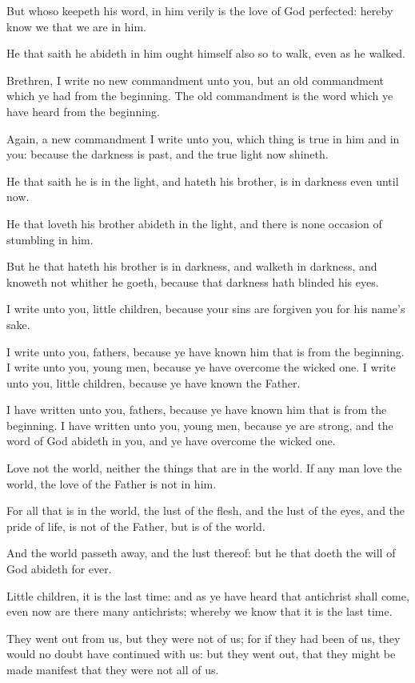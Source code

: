 \verse But whoso keepeth his word, in him verily is the love of God perfected: hereby know we that we are in him.

\verse He that saith he abideth in him ought himself also so to walk, even as he walked.

\verse Brethren, I write no new commandment unto you, but an old commandment which ye had from the beginning. The old commandment is the word which ye have heard from the beginning.

\verse Again, a new commandment I write unto you, which thing is true in him and in you: because the darkness is past, and the true light now shineth.

\verse He that saith he is in the light, and hateth his brother, is in darkness even until now.

\verse He that loveth his brother abideth in the light, and there is none occasion of stumbling in him.

\verse But he that hateth his brother is in darkness, and walketh in darkness, and knoweth not whither he goeth, because that darkness hath blinded his eyes.

\verse I write unto you, little children, because your sins are forgiven you for his name's sake.

\verse I write unto you, fathers, because ye have known him that is from the beginning. I write unto you, young men, because ye have overcome the wicked one. I write unto you, little children, because ye have known the Father.

\verse I have written unto you, fathers, because ye have known him that is from the beginning. I have written unto you, young men, because ye are strong, and the word of God abideth in you, and ye have overcome the wicked one.

\verse Love not the world, neither the things that are in the world. If any man love the world, the love of the Father is not in him.

\verse For all that is in the world, the lust of the flesh, and the lust of the eyes, and the pride of life, is not of the Father, but is of the world.

\verse And the world passeth away, and the lust thereof: but he that doeth the will of God abideth for ever.

\verse Little children, it is the last time: and as ye have heard that antichrist shall come, even now are there many antichrists; whereby we know that it is the last time.

\verse They went out from us, but they were not of us; for if they had been of us, they would no doubt have continued with us: but they went out, that they might be made manifest that they were not all of us.

